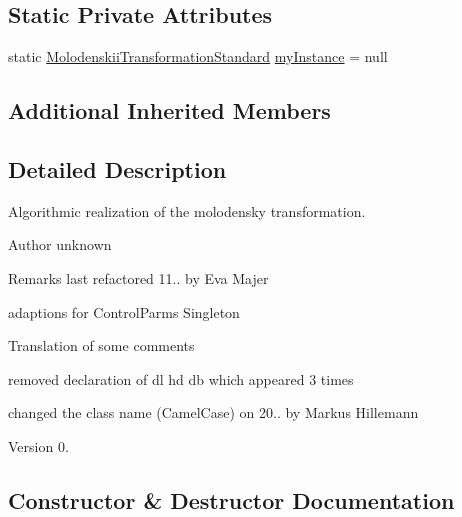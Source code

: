 \subsection*{Static Private Attributes}
\begin{DoxyCompactItemize}
\item 
static \hyperlink{classdatumstrategy_1_1_molodenskii_transformation_standard}{Molodenskii\+Transformation\+Standard} \hyperlink{classdatumstrategy_1_1_molodenskii_transformation_standard_adf5e42e21481a8c9d0f3f70606ccbbbd}{my\+Instance} = null
\end{DoxyCompactItemize}
\subsection*{Additional Inherited Members}


\subsection{Detailed Description}
Algorithmic realization of the molodensky transformation. 

\begin{DoxyAuthor}{Author}
unknown 
\end{DoxyAuthor}
\begin{DoxyRemark}{Remarks}
last refactored 11.. by Eva Majer ~\newline
 
\begin{DoxyItemize}
\item adaptions for Control\+Parms Singleton 
\item Translation of some comments 
\item removed declaration of dl hd db which appeared 3 times 
\end{DoxyItemize}

changed the class name (Camel\+Case) on 20.. by Markus Hillemann 
\end{DoxyRemark}
\begin{DoxyVersion}{Version}
0. 
\end{DoxyVersion}


\subsection{Constructor \& Destructor Documentation}
\mbox{\label{classdatumstrategy_1_1_molodenskii_transformation_standard_a57734f96ea69c6d385ce682a41427ac6}} 
